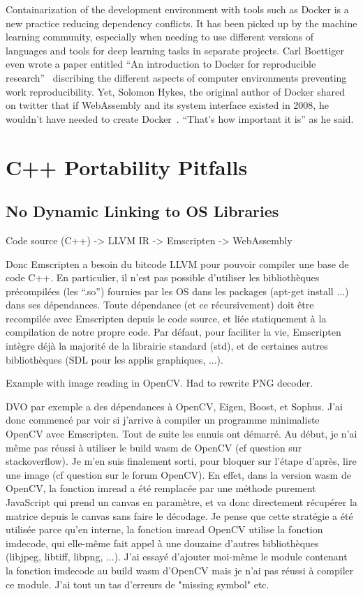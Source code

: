 Containarization of the development environment with tools such as Docker
is a new practice reducing dependency conflicts.
It has been picked up by the machine learning community,
especially when needing to use different versions of languages and tools
for deep learning tasks in separate projects.
Carl Boettiger even wrote a paper entitled
``An introduction to Docker for reproducible research''~\cite{boettiger2015introduction}
discribing the different aspects of computer environments preventing work reproducibility.
Yet, Solomon Hykes, the original author of Docker shared on twitter that
if WebAssembly and its system interface existed in 2008, he wouldn't have
needed to create Docker~\cite{hykes2019twitter}. ``That's how important it is'' as he said.

\section{C++ Portability Pitfalls}%
\label{sec:cpp_pitfalls}

\subsection{No Dynamic Linking to OS Libraries}%
\label{sub:no_dynamic_linking}

Code source (C++) -> LLVM IR -> Emscripten -> WebAssembly

Donc Emscripten a besoin du bitcode LLVM pour pouvoir compiler une base de code C++. En particulier, il n’est pas possible d’utiliser les bibliothèques précompilées (les “.so”) fournies par les OS dans les packages (apt-get install ...) dans ses dépendances. Toute dépendance (et ce récursivement) doit être recompilée avec Emscripten depuis le code source, et liée statiquement à la compilation de notre propre code. Par défaut, pour faciliter la vie, Emscripten intègre déjà la majorité de la librairie standard (std), et de certaines autres bibliothèques (SDL pour les applis graphiques, ...).

Example with image reading in OpenCV.
Had to rewrite PNG decoder.


DVO par exemple a des dépendances à OpenCV, Eigen, Boost, et Sophus. J’ai donc commencé par voir si j’arrive à compiler un programme minimaliste OpenCV avec Emscripten. Tout de suite les ennuis ont démarré. Au début, je n’ai même pas réussi à utiliser le build wasm de OpenCV (cf question sur stackoverflow). Je m’en suis finalement sorti, pour bloquer sur l’étape d’après, lire une image (cf question sur le forum OpenCV). En effet, dans la version wasm de OpenCV, la fonction imread a été remplacée par une méthode purement JavaScript qui prend un canvas en paramètre, et va donc directement récupérer la matrice depuis le canvas sans faire le décodage. Je pense que cette stratégie a été utilisée parce qu’en interne, la fonction imread OpenCV utilise la fonction imdecode, qui elle-même fait appel à une douzaine d’autres bibliothèques (libjpeg, libtiff, libpng, ...). J’ai essayé d’ajouter moi-même le module contenant la fonction imdecode au build wasm d’OpenCV mais je n’ai pas réussi à compiler ce module. J’ai tout un tas d’erreurs de "missing symbol" etc.


